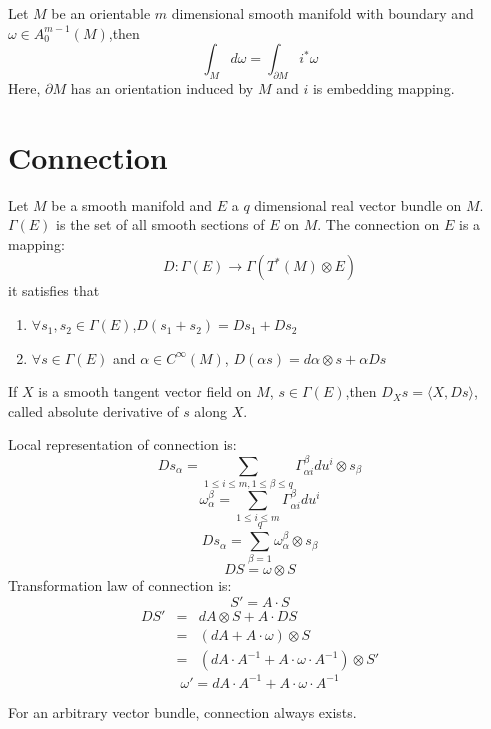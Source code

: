 \begin{newthem} 
Let $M$ be an orientable $m$ dimensional smooth manifold with boundary and $\omega \in A_0^{m-1}(M)$,then
\[\int_{M} d\omega = \int_{\partial M} i^* \omega\]
Here, $\partial M$ has an orientation induced by $M$ and $i$ is  embedding mapping.
\end{newthem}

\section{Connection}
\begin{newdef}[Connection] 
Let $M$ be a smooth manifold and $E$ a $q$ dimensional real vector bundle on $M$. $\Gamma(E)$ is the set of all smooth sections of $E$ on $M$. The connection on $E$ is a mapping:
\[D:\Gamma(E) \to \Gamma(T^*(M) \otimes E)\]
it satisfies that
\begin{enumerate}
\item $\forall s_1 ,s_2 \in \Gamma(E)$,$D(s_1+s_2) = Ds_1+Ds_2$
\item $\forall s \in \Gamma(E)$ and $\alpha \in C^{\infty}(M)$, $D(\alpha s) = d\alpha \otimes s + \alpha Ds$
\end{enumerate}
If $X$ is a smooth tangent vector field on $M$, $s \in \Gamma(E)$,then
$D_{X}s = \langle X, Ds \rangle$, called absolute derivative of $s$ along $X$.
\end{newdef}

\vspace{50pt}

\begin{newprop}
Local representation of connection is: 
\[Ds_{\alpha} = \sum_{1 \leq i \leq m,1 \leq \beta \leq q} \Gamma^{\beta}_{\alpha i} du^i \otimes s_{\beta}\]
\[\omega^{\beta}_{\alpha} = \sum_{1 \leq i \leq m} \Gamma^{\beta}_{\alpha i} du^i\]
\[Ds_{\alpha} = \sum_{\beta=1}^{q} \omega^{\beta}_{\alpha} \otimes s_{\beta}\]
\[DS = \omega \otimes S\]
Transformation law of connection is:
\[S' = A \cdot S\] 
\begin{eqnarray}
DS' &=& dA \otimes S + A \cdot DS \nonumber \\
&=& (dA + A \cdot \omega) \otimes S \nonumber \\
&=& (dA \cdot A^{-1} + A \cdot \omega \cdot A^{-1}) \otimes S' \nonumber
\end{eqnarray}
\[\omega' = dA \cdot A^{-1} + A \cdot \omega \cdot A^{-1}\]
\end{newprop}

\begin{newthem}
For an arbitrary vector bundle, connection always exists.
\end{newthem}

